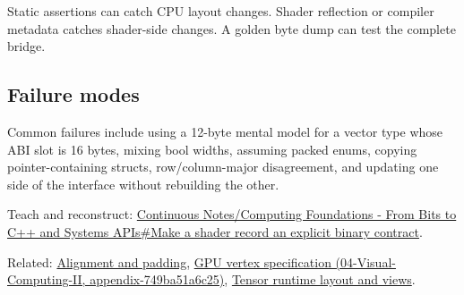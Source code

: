 Static assertions can catch CPU layout changes. Shader reflection or compiler metadata catches shader-side changes. A golden byte dump can test the complete bridge.

\subsection{Failure modes}\label{appendix-749048795dbb-failure-modes}

Common failures include using a 12-byte mental model for a vector type whose ABI slot is 16 bytes, mixing bool widths, assuming packed enums, copying pointer-containing structs, row/column-major disagreement, and updating one side of the interface without rebuilding the other.

Teach and reconstruct: \hyperref[01-foundations-i-ch008-make-a-shader-record-an-explicit-binary-contract]{Continuous Notes/Computing Foundations - From Bits to C++ and Systems APIs\#Make a shader record an explicit binary contract}.

Related: \hyperref[appendix-a1f7c53b4742]{Alignment and padding}, \href{../04-Visual-Computing-II/main.pdf\#nameddest=appendix-749ba51a6c25}{GPU vertex specification (04-Visual-Computing-II, appendix-749ba51a6c25)}, \hyperref[appendix-cebadf3106d1]{Tensor runtime layout and views}.
